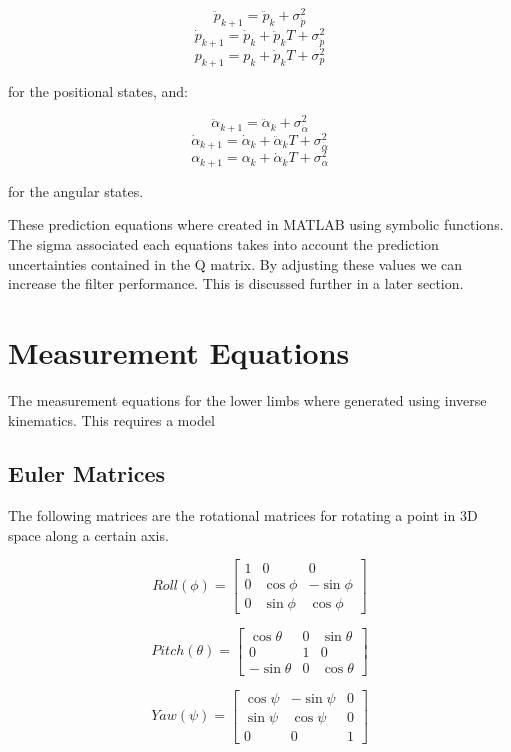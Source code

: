 $$ \ddot{p}_{k+1} = \ddot{p}_{k} + \sigma_{\ddot{p}}^{2} $$
$$ \dot{p}_{k+1} = \dot{p}_{k} + \ddot{p}_{k}T + \sigma_{\dot{p}}^{2} $$
$$ p_{k+1} = p_{k} + \dot{p}_{k}T + \sigma_{p}^{2} $$

for the positional states, and:

$$ \ddot{\alpha}_{k+1} = \ddot{\alpha}_{k} + \sigma_{\ddot{\alpha}}^{2} $$
$$ \dot{\alpha}_{k+1} = \dot{\alpha}_{k} + \ddot{\alpha}_{k}T + \sigma_{\dot{\alpha}}^{2} $$
$$ \alpha_{k+1} = \alpha_{k} + \dot{\alpha}_{k}T + \sigma_{\alpha}^{2} $$

for the angular states.

These prediction equations where created in MATLAB using symbolic functions. The sigma associated each equations takes into account the prediction uncertainties contained in the Q matrix. By adjusting these values we can increase the filter performance. This is discussed further in a later section.

\section{Measurement Equations}
The measurement equations for the lower limbs where generated using inverse kinematics. This requires a model

\subsection{Euler Matrices}
The following matrices are the rotational matrices for rotating a point in 3D space along a certain axis. 

$$
Roll(\phi) = 
\begin{bmatrix} 
1 & 0 & 0 \\ 
0 & \cos{\phi} & -\sin{\phi} \\ 
0 & \sin{\phi} & \cos{\phi}  
\end{bmatrix}
$$


$$
Pitch(\theta) = 
\begin{bmatrix} 
\cos{\theta} & 0 & \sin{\theta} \\ 
0 & 1 & 0 \\ 
-\sin{\theta} & 0 & \cos{\theta}  
\end{bmatrix}
$$


$$
Yaw(\psi) = 
\begin{bmatrix} 
\cos{\psi} & -\sin{\psi} & 0 \\ 
\sin{\psi} & \cos{\psi} & 0 \\ 
0 & 0 & 1  
\end{bmatrix}
$$


